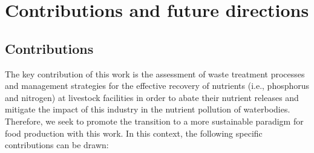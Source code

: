 \chapter{Contributions and future directions}\label{ch:Conclusions}

\section{Contributions}
The key contribution of this work is the assessment of waste treatment processes and management strategies for the effective recovery of nutrients (i.e., phosphorus and nitrogen) at livestock facilities
in order to abate their nutrient releases and mitigate the impact of this industry in the nutrient pollution of waterbodies. 
Therefore, we seek to promote the transition to a more sustainable paradigm for food production with this work. 
In this context, the following specific contributions can be drawn:

